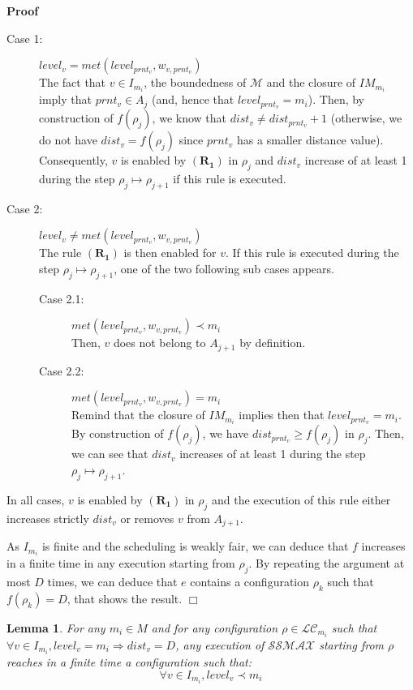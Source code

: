 \documentclass[11pt]{article}
\newenvironment{proof}{\noindent\textbf{Proof}}{\hfill\qed}
\newcommand{\qed}{\hfill$\Box$}
\newtheorem{lem}{Lemma}
\newenvironment{lemma}[1]{\vspace{-0.25cm}\begin{lem}#1}{\end{lem}\vspace{-0.3cm}}
\begin{document}
\begin{proof}
\begin{description}
\item[Case 1:] $level_v=met(level_{prnt_v},w_{v,prnt_v})$\\
The fact that $v\in I_{m_i}$, the boundedness of $\mathcal{M}$ and the closure of $IM_{m_i}$ imply that $prnt_v\in A_j$ (and, hence that $level_{prnt_v}=m_i$). Then, by construction of $f(\rho_j)$, we know that $dist_v\neq dist_{prnt_v}+1$ (otherwise, we do not have $dist_v=f(\rho_j)$ since $prnt_v$ has a smaller distance value). Consequently, $v$ is enabled by $\boldsymbol{(R_1)}$ in $\rho_j$ and $dist_v$ increase of at least 1 during the step $\rho_j\mapsto \rho_{j+1}$ if this rule is executed.
\item[Case 2:] $level_v\neq met(level_{prnt_v},w_{v,prnt_v})$\\
The rule $\boldsymbol{(R_1)}$ is then enabled for $v$. If this rule is executed during the step $\rho_j\mapsto \rho_{j+1}$, one of the two following sub cases appears.
\begin{description}
\item[Case 2.1:] $met(level_{prnt_v},w_{v,prnt_v})\prec m_i$\\
Then, $v$ does not belong to $A_{j+1}$ by definition. 
\item[Case 2.2:] $met(level_{prnt_v},w_{v,prnt_v})=m_i$\\
Remind that the closure of $IM_{m_i}$ implies then that $level_{prnt_v}=m_i$. By construction of $f(\rho_j)$, we have $dist_{prnt_v}\geq f(\rho_j)$ in $\rho_j$. Then, we can see that $dist_v$ increases of at least 1 during the step $\rho_j\mapsto \rho_{j+1}$.
\end{description}
\end{description}

In all cases, $v$ is enabled by $\boldsymbol{(R_1)}$ in $\rho_j$ and the execution of this rule either increases strictly $dist_v$ or removes $v$ from $A_{j+1}$.

As $I_{m_i}$ is finite and the scheduling is weakly fair, we can deduce that $f$ increases in a finite time in any execution starting from $\rho_j$. By repeating the argument at most $D$ times, we can deduce that $e$ contains a configuration $\rho_k$ such that $f(\rho_k)=D$, that shows the result.
\end{proof}

\begin{lemma}\label{lem:distDtolevelmi}
For any $m_i\in M$ and for any configuration $\rho\in \mathcal{LC}_{m_i}$ such that
$\forall v\in I_{m_i},level_v=m_i\Rightarrow dist_v=D$, any execution of $\mathcal{SSMAX}$ starting from $\rho$ reaches in a finite time a configuration such that:
\[\forall v\in I_{m_i},level_v\prec m_i\]
\end{lemma}
\end{document}
